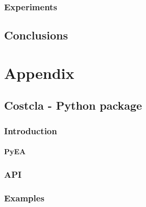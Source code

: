 \documentclass[twoside,openright,titlepage,numbers=noenddot,headinclude,%
               footinclude=true,cleardoublepage=empty,abstractoff,BCOR=5mm,%
               paper=a4,fontsize=11pt,ngerman,american]{scrreprt}
\numberwithin{theorem}{chapter}
\numberwithin{definition}{chapter}
\numberwithin{algorithm}{chapter}
\numberwithin{figure}{chapter}
\numberwithin{table}{chapter}
\numberwithin{equation}{chapter}
\begin{document}
		\section{Experiments}
			
% 
% 
% 
 
\cleardoublepage
\makeatletter
\def\toclevel@chapter{-1}
\makeatother
\chapter{Conclusions}

\appendix
\cleardoublepage
\part{Appendix}
	\chapter{Costcla - Python package}
		\section{Introduction}
			\subsection{PyEA}
		\section{API}
		\section{Examples}

	\cleardoublepage

\cleardoublepage
\end{document}
